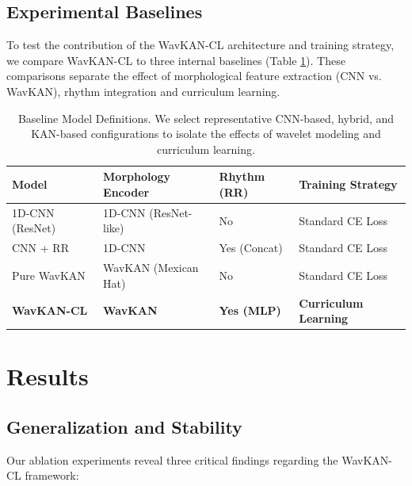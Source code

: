 \documentclass[pdflatex,sn-mathphys-num]{sn-jnl}
\theoremstyle{thmstyleone}
\theoremstyle{thmstyletwo}
\theoremstyle{thmstylethree}
\begin{document}
\subsection{Experimental Baselines}
To test the contribution of the WavKAN-CL architecture and training strategy, we compare WavKAN-CL to three internal baselines (Table \ref{tab:baselines}). These comparisons separate the effect of morphological feature extraction (CNN vs. WavKAN), rhythm integration and curriculum learning.

\begin{table}[!t]
\caption{Baseline Model Definitions. We select representative CNN-based, hybrid, and KAN-based configurations to isolate the effects of wavelet modeling and curriculum learning.}
\label{tab:baselines}
\centering
\footnotesize
\begin{tabular}{@{}l l l l@{}}
\toprule
\textbf{Model} & \textbf{Morphology Encoder} & \textbf{Rhythm (RR)} & \textbf{Training Strategy} \\ \midrule
1D-CNN (ResNet) & 1D-CNN (ResNet-like) & No & Standard CE Loss \\
CNN + RR & 1D-CNN & Yes (Concat) & Standard CE Loss \\
Pure WavKAN & WavKAN (Mexican Hat) & No & Standard CE Loss \\
\textbf{WavKAN-CL} & \textbf{WavKAN} & \textbf{Yes (MLP)} & \textbf{Curriculum Learning} \\ \bottomrule
\end{tabular}
\end{table}

\section{Results}
\label{sec:results}

\subsection{Generalization and Stability}
Our ablation experiments reveal three critical findings regarding the WavKAN-CL framework:
\end{document}
